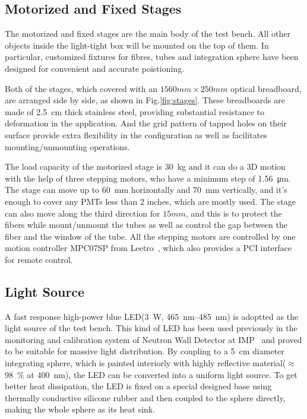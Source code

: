 \documentclass[5p, times]{elsarticle}
\begin{document}
\subsection{Motorized and Fixed Stages}
\label{sec:stages}

The motorized and fixed stages are the main body of the test bench.
All other objects inside the light-tight box will be mounted on the top of them.
In particular, customized fixtures for fibres, tubes and integration sphere have been designed for convenient and accurate poistioning.

Both of the stages, which covered with an $1560mm\times250mm$ optical breadboard, are arranged side by side, as shown in Fig.\ref{fig:stages}.
These breadboards are made of \SI{2.5}{cm} thick stainless steel, providing substantial resistance to deformation in the application. And the grid pattern of tapped holes on their surface provide extra flexibility in the configuration as well as facilitates mounting/unmounting operations.

The load capacity of the motorized stage is \SI{30}{\kilo\gram} and it can do a 3D motion with the help of three stepping motors, who have a minimum step of \SI{1.56}{\micro\meter}.
The stage can move up to \SI{60}{\milli\meter} horizontally and \SI{70}{\milli\meter} vertically, and it's enough to cover any PMTs less than 2 inches, which are mostly used.
The stage can also move along the third direction for $15mm$, and this is to protect the fibers while mount/unmount the tubes as well as control the gap between the fiber and the window of the tube.
All the stepping motors are controlled by one motion controller MPC07SP from Leetro~\cite{leetro}, which also provides a PCI interface for remote control.

\subsection{Light Source}
\label{sec:light_source}

A fast response high-power blue LED(\SI{3}{\watt}, \SIrange{465}{485}{\nano\meter}) is adoptted as the light source of the test bench. This kind of LED has been used previously in the monitoring and calibration system of Neutron Wall Detector at IMP~\cite{yuyuhong_led} and proved to be suitable for massive light distribution. 
By coupling to a \SI{5}{\centi\meter} diameter integrating sphere, which is painted interiorly with highly reflective material($\approx$\SI{98}{\percent} at \SI{400}{\nano\meter}), the LED can be converted into a uniform light source.
To get better heat dissipation, the LED is fixed on a special designed base using thermally conductive silicone rubber and then coupled to the sphere directly, making the whole sphere as its heat sink.
\end{document}
